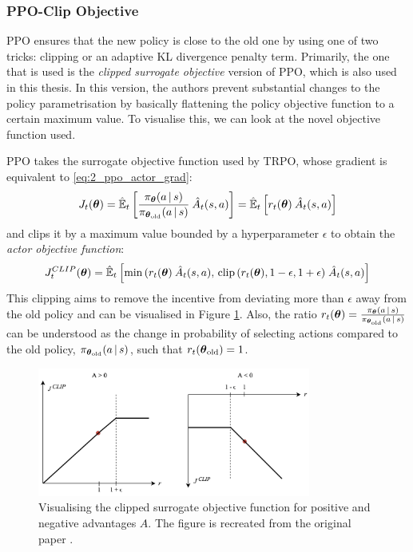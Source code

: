 \subsubsection{PPO-Clip Objective}
PPO ensures that the new policy is close to the old one by using one of two tricks: clipping or an adaptive KL divergence penalty term. Primarily, the one that is used is the \textit{clipped surrogate objective} version of PPO, which is also used in this thesis. In this version, the authors prevent substantial changes to the policy parametrisation by basically flattening the policy objective function to a certain maximum value. To visualise this, we can look at the novel objective function used.

PPO takes the surrogate objective function used by TRPO, whose gradient is equivalent to \eqref{eq:2_ppo_actor_grad}:
\begin{equation}
    J_t(\boldsymbol{\theta}) = \hat{\mathbb{E}}_t \left[ 
    \frac{\pi_{\boldsymbol{\theta}} (a \, | \, s)}{\pi_{\boldsymbol{\theta}_\text{old}} (a \, | \, s)} \: \hat{A}_t (s, a) 
    \right]
    = \hat{\mathbb{E}}_t \left[ 
    r_t(\boldsymbol{\theta}) \: \hat{A}_t (s, a) 
    \right] \label{eq:2_trpo_actor_objective}
\end{equation}
and clips it by a maximum value bounded by a hyperparameter $\epsilon$ to obtain the \textit{actor objective function}:
\begin{equation}
    J_t^{CLIP}(\boldsymbol{\theta}) = \hat{\mathbb{E}}_t \left[ \min\,(
    r_t(\boldsymbol{\theta}) \: \hat{A}_t (s, a), \, \text{clip}\, ( r_t(\boldsymbol{\theta}), 1-\epsilon, 1+\epsilon) \; \hat{A}_t(s,a)
    \right]
    \label{eq:2_ppo_clipped_objective}
\end{equation}
This clipping aims to remove the incentive from deviating more than $\epsilon$ away from the old policy \cite{PPO} and can be visualised in Figure \ref{fig:2_ppo_actor_clip}. Also, the ratio $r_t(\boldsymbol{\theta}) = \frac{\pi_{\boldsymbol{\theta}} (a \, | \, s)}{\pi_{\boldsymbol{\theta}_\text{old}} (a \, | \, s)}$ can be understood as the change in probability of selecting actions compared to the old policy, $\pi_{\boldsymbol{\theta}_\text{old}} (a \, | \, s)$, such that $r_t(\boldsymbol{\theta}_{\text{old}}) = 1$.
\begin{figure}[htb]
    \centering
    \includegraphics[width=0.8\textwidth]{figures/2_RL/2_ppo_actor_clip.png}
    \caption{Visualising the clipped surrogate objective function for positive and negative advantages $A$. The figure is recreated from the original paper \cite{PPO}.}
    \label{fig:2_ppo_actor_clip}
\end{figure}


